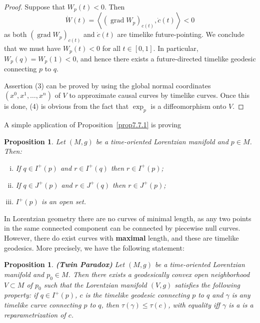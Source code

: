 \documentclass[12pt]{amsart}
\newcommand{\grad}{\operatorname{grad}}
\newtheorem{Prop}[Thm]{Proposition}
\theoremstyle{definition}
\theoremstyle{remark}
\begin{document}
\begin{proof}
Suppose that $W_p(t) < 0$. Then 
\[
\dot{W}(t) = \left\langle \left(\grad W_p\right)_{c(t)}, \dot{c}(t) \right\rangle < 0
\]
as both $\left(\grad W_p\right)_{c(t)}$ and $\dot{c}(t)$ are timelike future-pointing. We conclude that we must have $W_p(t)<0$ for all $t\in[0,1]$. In particular, $W_p(q)=W_p(1)<0$, and hence there exists a future-directed timelike geodesic connecting $p$ to $q$.

Assertion (3) can be proved by using the global normal coordinates $(x^0,x^1,\ldots,x^n)$ of $V$ to approximate causal curves by timelike curves. Once this is done, (4) is obvious from the fact that $\exp_p$ is a diffeomorphism onto $V$.
\end{proof}

A simple application of Proposition~\ref{prop7.7.1} is proving

\begin{Prop}
Let $(M,g)$ be a time-oriented Lorentzian manifold and $p \in M$. Then:
\begin{enumerate}[(i)]
\item
If $q \in I^+(p)$ and $r \in I^+(q)$ then $r \in I^+(p)$;
\item
If $q \in J^+(p)$ and $r \in J^+(q)$ then $r \in J^+(p)$;
\item
$I^+(p)$ is an open set.
\end{enumerate}
\end{Prop}

In Lorentzian geometry there are no curves of minimal length, as any two points in the same connected component can be connected by piecewise null curves. However, there do exist curves with {\bf maximal} length, and these are timelike geodesics. More precisely, we have the following statement:

\begin{Prop} \label{prop7.7.2}
{\bf (Twin Paradox)} Let $(M,g)$ be a time-oriented Lorentzian manifold and $p_0 \in M$. Then there exists a geodesically convex open neighborhood $V \subset M$ of $p_0$ such that the Lorentzian manifold $(V,g)$ satisfies the following property: if $q \in I^+(p)$, $c$ is the timelike geodesic connecting $p$ to $q$ and $\gamma$ is any timelike curve connecting $p$ to $q$, then $\tau(\gamma) \leq \tau(c)$, with equality iff $\gamma$ is a  is a reparametrization of $c$.
\end{Prop}
\end{document}
